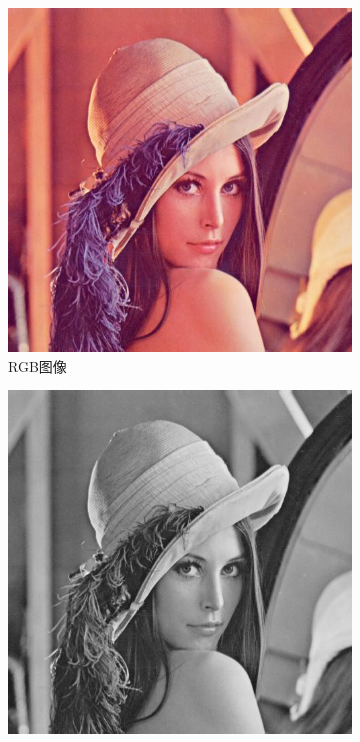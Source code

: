 \begin{figure}[ht]
    \centering
    \begin{subfigure}{0.245\textwidth}
      \includegraphics[width=\linewidth]{pages/jpeg/origin.jpg}
      \caption{RGB图像}
      \label{Fig:RGB2YUV-o}
    \end{subfigure}
    \begin{subfigure}{0.245\textwidth}
      \includegraphics[width=\linewidth]{pages/jpeg/yuv-y.jpg}

\end{subfigure}
\end{figure}
